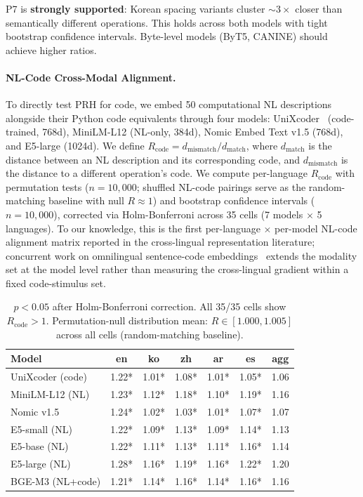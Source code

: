 \documentclass[11pt]{article}
\theoremstyle{definition}
\begin{document}
P7 is \textbf{strongly supported}: Korean spacing variants cluster ${\sim}3\times$ closer than semantically different operations. This holds across both models with tight bootstrap confidence intervals. Byte-level models (ByT5, CANINE) should achieve higher ratios.

\paragraph{NL-Code Cross-Modal Alignment.}
To directly test PRH for code, we embed 50 computational NL descriptions alongside their Python code equivalents through four models: UniXcoder~\cite{unixcoder} (code-trained, 768d), MiniLM-L12 (NL-only, 384d), Nomic Embed Text v1.5 (768d), and E5-large (1024d). We define $R_{\text{code}} = d_{\text{mismatch}} / d_{\text{match}}$, where $d_{\text{match}}$ is the distance between an NL description and its corresponding code, and $d_{\text{mismatch}}$ is the distance to a different operation's code. We compute per-language $R_{\text{code}}$ with permutation tests ($n=10{,}000$; shuffled NL-code pairings serve as the random-matching baseline with null $R \approx 1$) and bootstrap confidence intervals ($n=10{,}000$), corrected via Holm-Bonferroni across 35 cells (7 models $\times$ 5 languages). To our knowledge, this is the first per-language $\times$ per-model NL-code alignment matrix reported in the cross-lingual representation literature; concurrent work on omnilingual sentence-code embeddings~\cite{omnisonar2026} extends the modality set at the model level rather than measuring the cross-lingual gradient within a fixed code-stimulus set.

\begin{table}[h]
\centering
\small
\begin{tabular}{lccccc|c}
\toprule
\textbf{Model} & \textbf{en} & \textbf{ko} & \textbf{zh} & \textbf{ar} & \textbf{es} & \textbf{agg} \\
\midrule
UniXcoder (code)   & 1.22* & 1.01* & 1.08* & 1.01* & 1.05* & 1.06 \\
MiniLM-L12 (NL)    & 1.23* & 1.12* & 1.18* & 1.10* & 1.19* & 1.16 \\
Nomic v1.5         & 1.24* & 1.02* & 1.03* & 1.01* & 1.07* & 1.07 \\
E5-small (NL)      & 1.22* & 1.09* & 1.13* & 1.09* & 1.14* & 1.13 \\
E5-base (NL)       & 1.22* & 1.11* & 1.13* & 1.11* & 1.16* & 1.14 \\
E5-large (NL)      & 1.28* & 1.16* & 1.19* & 1.16* & 1.22* & 1.20 \\
BGE-M3 (NL+code)   & 1.21* & 1.14* & 1.16* & 1.14* & 1.16* & 1.16 \\
\bottomrule
\end{tabular}
\caption*{\small * $p < 0.05$ after Holm-Bonferroni correction. All 35/35 cells show $R_{\text{code}} > 1$. Permutation-null distribution mean: $R \in [1.000, 1.005]$ across all cells (random-matching baseline).}
\end{table}
\end{document}
